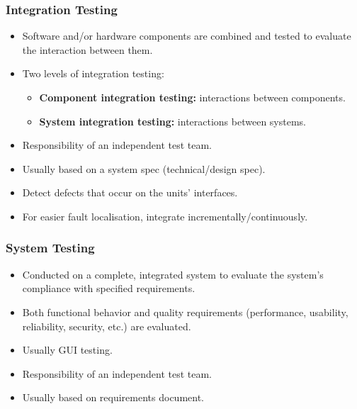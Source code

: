 \documentclass[../ESOF_notes.tex]{subfiles}
\begin{document}
        \subsubsection{Integration Testing}
            \begin{itemize}
                \item Software and/or hardware components are
                combined and tested to evaluate the interaction
                 between them.
                \item Two levels of integration testing:
                    \begin{itemize}
                        \item \textbf{Component integration testing:} 
                        interactions between components.
                        \item \textbf{System integration testing:}
                        interactions between systems.
                    \end{itemize} 
                \item Responsibility of an independent test team.
                \item Usually based on a system spec (technical/design spec).
                \item Detect defects that occur on the units’ interfaces.
                \item For easier fault localisation, integrate 
                incrementally/continuously.
            \end{itemize}
        \subsubsection{System Testing}
            \begin{itemize}
                \item Conducted on a complete, integrated system 
                to evaluate the system's compliance with specified 
                requirements.                
                \item Both functional behavior and quality requirements
                (performance, usability, reliability, security, etc.) 
                are evaluated.   
                \item Usually GUI testing.
                \item Responsibility of an independent test team.
                \item Usually based on requirements document.
            \end{itemize}
\end{document}
